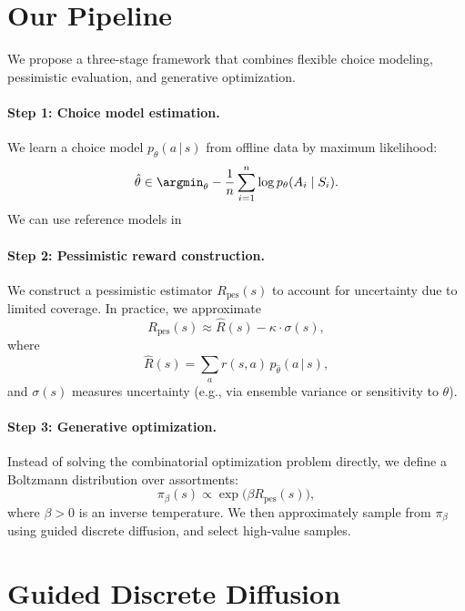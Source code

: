 \documentclass[11pt]{article}
\begin{document}
\section{Our Pipeline}

We propose a three-stage framework that combines flexible choice modeling, pessimistic evaluation, and generative optimization.

\paragraph{Step 1: Choice model estimation.}
We learn a choice model $p_\theta(a\,|\, s)$ from offline data by maximum likelihood:
\begin{equation*}
\hat{\theta}
\in
\argmin_{\theta}
-\frac{1}{n} \sum_{i=1}^n \log p_\theta(A_i \mid S_i).
\end{equation*}
We can use reference models in \citep{wang2023neural}

\paragraph{Step 2: Pessimistic reward construction.}
We construct a pessimistic estimator $R_{\mathrm{pes}}(s)$ to account for uncertainty due to limited coverage. In practice, we approximate
\begin{equation*}
R_{\mathrm{pes}}(s)
\approx
\hat{R}(s) - \kappa \cdot \sigma(s),
\end{equation*}
where
\begin{equation*}
\hat{R}(s)=\sum_a r(s,a)\, p_{\hat{\theta}}(a\,|\, s),
\end{equation*}
and $\sigma(s)$ measures uncertainty (e.g., via ensemble variance or sensitivity to $\theta$).

\paragraph{Step 3: Generative optimization.}
Instead of solving the combinatorial optimization problem directly, we define a Boltzmann distribution over assortments:
\begin{equation*}
\pi_\beta(s)
\propto
\exp\bigl(\beta R_{\mathrm{pes}}(s)\bigr),
\end{equation*}
where $\beta > 0$ is an inverse temperature. We then approximately sample from $\pi_\beta$ using guided discrete diffusion, and select high-value samples.

\section{Guided Discrete Diffusion}
\end{document}
